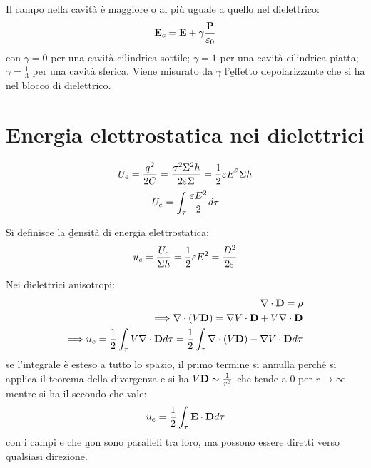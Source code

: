Il campo nella cavità è maggiore o al più uguale a quello nel dielettrico:
\begin{equation}\begin{split}
\mathbf{E}_c=\mathbf{E}+\gamma\frac{\mathbf{P}}{\varepsilon_0}
\end{split}\end{equation}
con $\gamma=0$ per una cavità cilindrica sottile; $\gamma=1$ per una cavità cilindrica piatta; $\gamma=\frac{1}{3}$ per una cavità sferica. Viene misurato da $\gamma$ l'\b{effetto depolarizzante} che si ha nel blocco di dielettrico.

\section{Energia elettrostatica nei dielettrici}%
\begin{equation}\begin{split}
U_e=\frac{q^2}{2C}=\frac{\sigma^2\Sigma^2h}{2\varepsilon\Sigma}=\frac{1}{2}\varepsilon E^2\Sigma h
\end{split}\end{equation}
\begin{equation}\begin{split}
U_e=\int_\tau{\frac{\varepsilon E^2}{2}d\tau}
\end{split}\end{equation}

Si definisce la \b{densità di energia elettrostatica}:
\begin{equation}\begin{split}
u_e=\frac{U_e}{\Sigma h}=\frac{1}{2}\varepsilon E^2=\frac{D^2}{2\varepsilon}
\end{split}\end{equation}

Nei dielettrici anisotropi:
\begin{equation}\begin{split}
\nabla\cdot\mathbf{D}=\rho\\
\Longrightarrow \nabla\cdot(V\mathbf{D})=\nabla V\cdot\mathbf{D}+V\nabla\cdot\mathbf{D}\\
\Longrightarrow u_e=\frac{1}{2}\int_\tau{V\nabla\cdot\mathbf{D}d\tau}=\frac{1}{2}\int_\tau{\nabla\cdot(V\mathbf{D})-\nabla V\cdot\mathbf{D}d\tau}
\end{split}\end{equation}
se l'integrale è esteso a tutto lo spazio, il primo termine si annulla perché si applica il teorema della divergenza e si ha $V\mathbf{D}\sim\frac{1}{r^3}$ che tende a 0 per $r\to\infty$ mentre si ha il secondo che vale:
\begin{equation}\begin{split}
u_e=\frac{1}{2}\int_\tau{\mathbf{E}\cdot\mathbf{D}d\tau}
\end{split}\end{equation}
con i campi \dE e \dD che \b{non sono paralleli tra loro}, ma possono essere diretti verso qualsiasi direzione.

